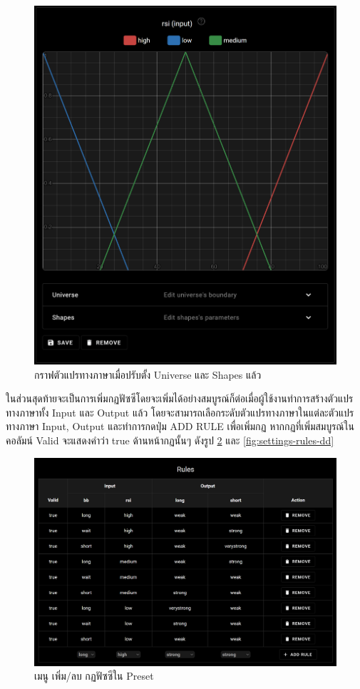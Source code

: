 \begin{figure}[ht]
    \centering
    \includegraphics[scale=0.5]{images/web-tuts/settings-lingvar-edited-graph.PNG}
    \caption{กราฟตัวแปรทางภาษาเมื่อปรับตั้ง Universe และ Shapes แล้ว}
    \label{fig:settings-lingvar-edited-graph}
\end{figure}
\FloatBarrier
ในส่วนสุดท้ายจะเป็นการเพิ่มกฏฟัซซีโดยจะเพิ่มได้อย่างสมบูรณ์ก็ต่อเมื่อผู้ใช้งานทำการสร้างตัวแปรทางภาษาทั้ง Input และ Output แล้ว โดยจะสามารถเลือกระดับตัวแปรทางภาษาในแต่ละตัวแปรทางภาษา Input, Output และทำการกดปุ่ม ADD RULE เพื่อเพิ่มกฏ หากกฏที่เพิ่มสมบูรณ์ในคอลัมน์ Valid จะแสดงคำว่า true ด้านหน้ากฏนั้นๆ ดังรูป \ref{fig:settings-rules} และ \ref{fig:settings-rules-dd}
\begin{figure}[ht]
    \centering
    \includegraphics[width=\textwidth]{images/web-tuts/settings-rules.PNG}
    \caption{เมนู เพิ่ม/ลบ กฏฟัซซีใน Preset}
    \label{fig:settings-rules}
\end{figure}
